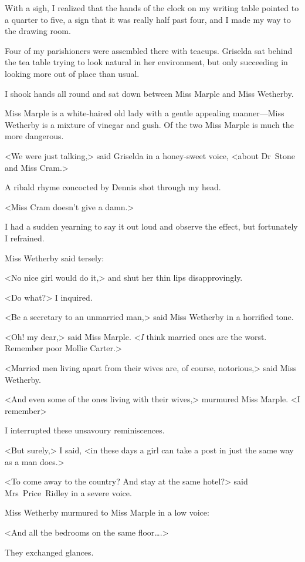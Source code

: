 With a sigh, I realized that the hands of the clock on my writing table pointed to a quarter to five, a sign that it was really half past four, and I made my way to the drawing room.

Four of my parishioners were assembled there with teacups. Griselda sat behind the tea table trying to look natural in her environment, but only succeeding in looking more out of place than usual.

I shook hands all round and sat down between Miss Marple and Miss Wetherby.

Miss Marple is a white-haired old lady with a gentle appealing manner—Miss Wetherby is a mixture of vinegar and gush. Of the two Miss Marple is much the more dangerous.

<We were just talking,> said Griselda in a honey-sweet voice, <about Dr~Stone and Miss Cram.>

A ribald rhyme concocted by Dennis shot through my head.

<Miss Cram doesn't give a damn.>

I had a sudden yearning to say it out loud and observe the effect, but fortunately I refrained.

Miss Wetherby said tersely:

<No nice girl would do it,> and shut her thin lips disapprovingly.

<Do what?> I inquired.

<Be a secretary to an unmarried man,> said Miss Wetherby in a horrified tone.

<Oh! my dear,> said Miss Marple. <\emph{I} think married ones are the worst. Remember poor Mollie Carter.>

<Married men living apart from their wives are, of course, notorious,> said Miss Wetherby.

<And even some of the ones living with their wives,> murmured Miss Marple. <I remember\longdash>

I interrupted these unsavoury reminiscences.

<But surely,> I said, <in these days a girl can take a post in just the same way as a man does.>

<To come away to the country? And stay at the same hotel?> said Mrs~Price~Ridley in a severe voice.

Miss Wetherby murmured to Miss Marple in a low voice:

<And all the bedrooms on the same floor\dots.>

They exchanged glances.

